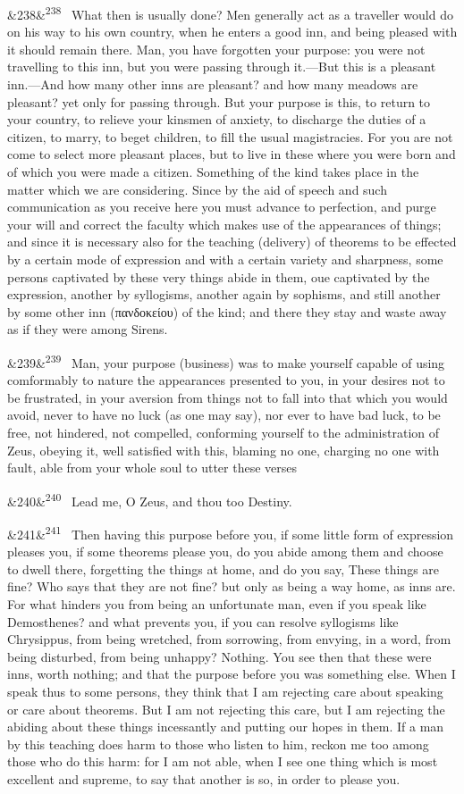 \documentclass[12pt]{article}
\newcommand{\para}[1][]{\par\noindent\ifx&#1&\else\textsuperscript{\footnotesize #1}~\fi}
\begin{document}
\para[238] What then is usually done? Men generally act as a traveller would do on his way to his own country, when he enters a good inn, and being pleased with it should remain there. Man, you have forgotten your purpose: you were not travelling to this inn, but you were passing through it.—But this is a pleasant inn.—And how many other inns are pleasant? and how many meadows are pleasant? yet only for passing through. But your purpose is this, to return to your country, to relieve your kinsmen of anxiety, to discharge the duties of a citizen, to marry, to beget children, to fill the usual magistracies. For you are not come to select more pleasant places, but to live in these where you were born and of which you were made a citizen. Something of the kind takes place in the matter which we are considering. Since by the aid of speech and such communication as you receive here you must advance to perfection, and purge your will and correct the faculty which makes use of the appearances of things; and since it is necessary also for the teaching (delivery) of theorems to be effected by a certain mode of expression and with a certain variety and sharpness, some persons captivated by these very things abide in them, oue captivated by the expression, another by syllogisms, another again by sophisms, and still another by some other inn (πανδοκείου) of the kind; and there they stay and waste away as if they were among Sirens.

\para[239] Man, your purpose (business) was to make yourself capable of using comformably to nature the appearances presented to you, in your desires not to be frustrated, in your aversion from things not to fall into that which you would avoid, never to have no luck (as one may say), nor ever to have bad luck, to be free, not hindered, not compelled, conforming yourself to the administration of Zeus, obeying it, well satisfied with this, blaming no one, charging no one with fault, able from your whole soul to utter these verses

\para[240] Lead me, O Zeus, and thou too Destiny.

\para[241] Then having this purpose before you, if some little form of expression pleases you, if some theorems please you, do you abide among them and choose to dwell there, forgetting the things at home, and do you say, These things are fine? Who says that they are not fine? but only as being a way home, as inns are. For what hinders you from being an unfortunate man, even if you speak like Demosthenes? and what prevents you, if you can resolve syllogisms like Chrysippus, from being wretched, from sorrowing, from envying, in a word, from being disturbed, from being unhappy? Nothing. You see then that these were inns, worth nothing; and that the purpose before you was something else. When I speak thus to some persons, they think that I am rejecting care about speaking or care about theorems. But I am not rejecting this care, but I am rejecting the abiding about these things incessantly and putting our hopes in them. If a man by this teaching does harm to those who listen to him, reckon me too among those who do this harm: for I am not able, when I see one thing which is most excellent and supreme, to say that another is so, in order to please you.
\end{document}
